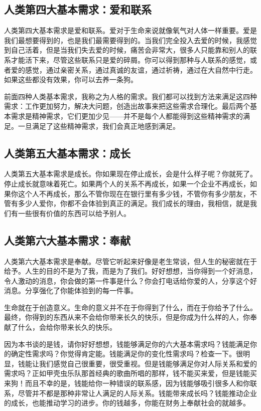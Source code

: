 \subsection{人类第四大基本需求：爱和联系}

人类第四大基本需求是爱和联系。爱对于生命来说就像氧气对人体一样重要。爱是我们最想要得到的，也是我们最需要得到的。当我们完全投入去爱的时候，我感觉到自己活着，但是当我们失去爱的时候，痛苦会非常大，很多人只能靠和别人的联系才能活下来，尽管这些联系只是爱的碎屑。你可以得到那种与人联系的感觉，或者爱的感觉，通过亲密关系，通过真诚的友谊，通过祈祷，通过在大自然中行走。如果这些都没有效果，你可以去养一条狗。

前面四种人类基本需求，我称之为人格的需求。我们都可以找到方法来满足这四种需求：工作更加努力，解决大问题，创造出故事来把这些需求合理化。最后两个基本需求是精神需求，它们更加少见——并不是每个人都能得到这些精神需求的满足。一旦满足了这些精神需求，我们会真正地感到满足。

\subsection{人类第五大基本需求：成长}

人类第五大基本需求是成长。你如果现在停止成长，会是什么样子呢？你就死了。停止成长就意味着死亡。如果两个人的关系不再成长，如果一个企业不再成长，如果你这个人不再成长，那么不管你现在在银行里有多少钱，不管你有多少朋友，不管有多少人爱你，你都不会体验到真正的满足。我们成长的理由，我相信，就是我们有一些很有价值的东西可以给予别人。

\subsection{人类第六大基本需求：奉献}

人类第六大基本需求是奉献。尽管它听起来好像是老生常谈，但人生的秘密就在于给予。人生的目的不是为了我，而是为了我们。好好想想，当你得到一个好消息，令人激动的消息，你会做的第一件事是什么？你会打电话给你爱的人，分享这个好消息。分享强化了你能体验到的每一件事。

生命就在于创造意义。生命的意义并不在于你得到了什么，而在于你给予了什么。最终，你得到的东西从来不会给你带来长久的快乐，但是你成为什么样的人，你奉献了什么，会给你带来长久的快乐。

因为本书谈的是钱，请你好好想想，钱能够满足你的六大基本需求吗？钱能满足你的确定性需求吗？你觉得肯定能。钱能满足你的变化性需求吗？检查一下。很明显，钱能让我们感觉自己很重要，很受重视。但是钱能够满足你对人际关系和爱的需求吗？正如甲壳虫乐队那首经典的歌曲所唱的那样，钱不能买来爱，但是钱能买来狗！而且不幸的是，钱能给你一种错误的联系感，因为钱能够吸引很多人和你联系，尽管并不都是那种非常让人满足的人际关系。钱能带来成长吗？钱能推动企业的成长，也能推动学习的进步。你的钱越多，你能在财务上奉献社会的就越多。

